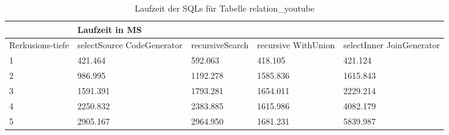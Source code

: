 \begin{table}[H]
	\begin{tabular}{l|l|l|l|l|l|}
		\cline{2-6}
		& \multicolumn{5}{|l|}{Laufzeit in MS}                                                                                                                                                  \\ \hline
		\multicolumn{1}{|l|}{\multirow{2}{2cm}{Rerkusions-tiefe}} & \multicolumn{2}{|l|}{\multirow{2}{3cm}{selectSource CodeGenerator}} & \multirow{2}{2.8cm}{recursiveSearch} & \multirow{2}{2.5cm}{recursive WithUnion} & \multirow{2}{2.5cm}{selectInner JoinGenerator} \\
		\multicolumn{1}{|l|}{}
		& \multicolumn{2}{|l|}{}                                           &                                  &                                     &                                           \\ \hline
		
		\multicolumn{1}{|l|}{1}                                 & \multicolumn{2}{l|}{421.464}                                     & 592.063                                               & 418.105                                                   & 421.124                                                         \\ \hline
		\multicolumn{1}{|l|}{2}                                 & \multicolumn{2}{l|}{986.995}                                     & 1192.278                                              & 1585.836                                                  & 1615.843                                                        \\ \hline
		\multicolumn{1}{|l|}{3}                                 & \multicolumn{2}{l|}{1591.391}                                    & 1793.281                                              & 1654.011                                                  & 2229.214                                                        \\ \hline
		\multicolumn{1}{|l|}{4}                                 & \multicolumn{2}{l|}{2250.832}                                    & 2383.885                                              & 1615.986                                                  & 4082.179                                                        \\ \hline
		\multicolumn{1}{|l|}{5}                                 & \multicolumn{2}{l|}{2905.167}                                    & 2964.950                                              & 1681.231                                                  & 5839.987                                                        \\ \hline
		
		
		
	\end{tabular}
	\caption{Laufzeit der SQLs für Tabelle relation\_youtube}
\end{table}



